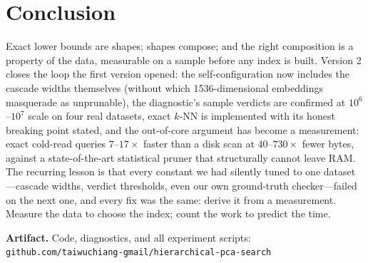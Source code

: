 \documentclass[sigconf,nonacm]{acmart}
\begin{document}
\section{Conclusion}

Exact lower bounds are shapes; shapes compose; and the right composition is
a property of the data, measurable on a sample before any index is built.
Version 2 closes the loop the first version opened: the self-configuration
now includes the cascade widths themselves (without which 1536-dimensional
embeddings masquerade as unprunable), the diagnostic's sample verdicts are
confirmed at $10^6$--$10^7$ scale on four real datasets, exact $k$-NN is
implemented with its honest breaking point stated, and the out-of-core
argument has become a measurement: exact cold-read queries $7$--$17\times$
faster than a disk scan at $40$--$730\times$ fewer bytes, against a
state-of-the-art statistical pruner that structurally cannot leave RAM.
The recurring lesson is that every constant we had silently tuned to one
dataset---cascade widths, verdict thresholds, even our own ground-truth
checker---failed on the next one, and every fix was the same: derive it
from a measurement. Measure the data to choose the index; count the work to
predict the time.

\vspace{1ex}
\noindent\textbf{Artifact.} Code, diagnostics, and all experiment scripts:\\
\texttt{github.com/taiwuchiang-gmail/hierarchical-pca-search}
\end{document}
